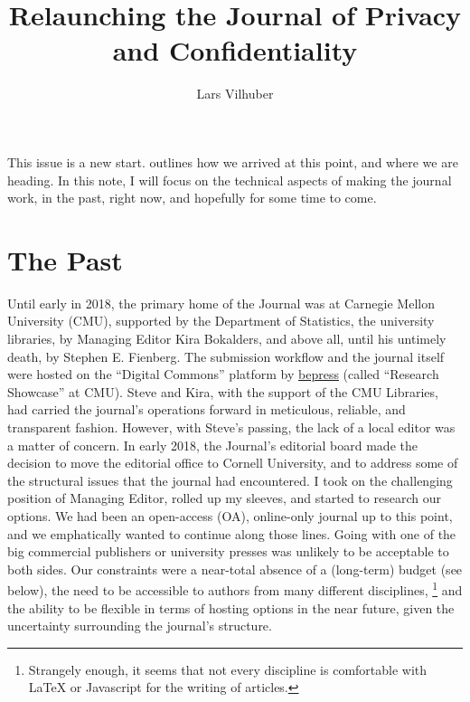 \documentclass[final]{jpcfinal} %
\begin{document}
\title[Relaunching JPC]{Relaunching the Journal of Privacy and Confidentiality}

\author{Lars Vilhuber}	%
\address{Managing Editor, Journal of Privacy and Confidentiality\newline 
Department of Economics, Cornell University}	%

\maketitle

This issue is a new start. \cite{DworkEditorial} outlines how we arrived at this point, and where we are heading. In this note, I will focus on the technical aspects of making the journal work, in the past, right  now, and hopefully for some time to come. 
\section{The Past}

Until early in 2018, the primary home of the Journal was at Carnegie Mellon University (CMU), supported by the Department of Statistics, the university libraries, by  Managing Editor Kira Bokalders, and above all, until his untimely death,  by Stephen E. Fienberg. The submission workflow and the journal itself were hosted on the ``Digital Commons'' platform by \href{https://www.bepress.com}{bepress} (called ``Research Showcase'' at CMU). Steve and Kira, with the support of the CMU Libraries, had carried the journal's operations forward in meticulous, reliable, and transparent fashion. However, with Steve's passing, the lack of a local editor was a matter of concern. In early 2018, the Journal's editorial board made the decision to move the editorial office to Cornell University, and to address some of the structural issues that the journal had encountered. I took on the challenging position of Managing Editor, rolled up my sleeves, and started to research our options. We had been an open-access (OA), online-only journal up to this point, and we emphatically wanted to continue along those lines. Going with one of the big commercial publishers or university presses was unlikely to be acceptable to both sides.  Our constraints were a near-total absence of a (long-term) budget (see below),  the need to be accessible to authors from many different disciplines,%
\footnote{Strangely enough, it seems that   not every discipline is comfortable with \LaTeX{} or Javascript for the writing of articles.}
and the ability to be flexible in terms of hosting options in the near future, given the uncertainty surrounding the journal's structure.
\end{document}
